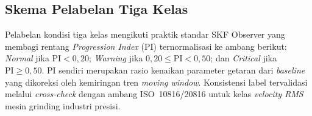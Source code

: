 \subsection{Skema Pelabelan Tiga Kelas}
\label{subsec:bab3_kls_label}

Pelabelan kondisi tiga kelas mengikuti praktik standar SKF Observer
yang membagi rentang \emph{Progression Index} (PI) ternormalisasi
ke ambang berikut: \emph{Normal} jika $\text{PI} < 0{,}20$; \emph{Warning}
jika $0{,}20 \leq \text{PI} < 0{,}50$; dan \emph{Critical} jika
$\text{PI} \geq 0{,}50$. PI sendiri merupakan rasio kenaikan
parameter getaran dari \emph{baseline} yang dikoreksi oleh kemiringan
tren \emph{moving window}. Konsistensi label tervalidasi melalui
\emph{cross-check} dengan ambang ISO~10816/20816 untuk kelas
\emph{velocity RMS} mesin grinding industri presisi.
